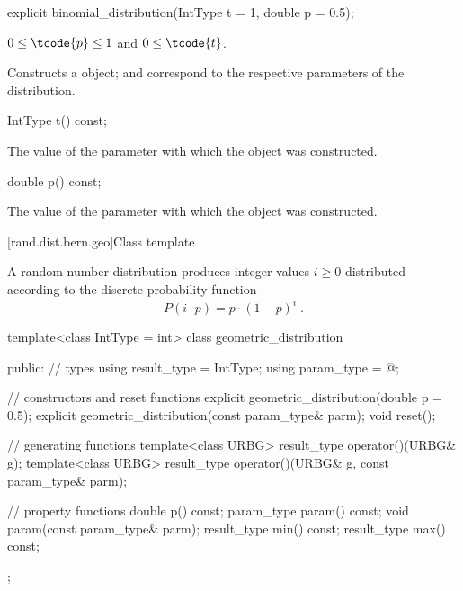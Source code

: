%
\begin{itemdecl}
explicit binomial_distribution(IntType t = 1, double p = 0.5);
\end{itemdecl}

\begin{itemdescr}
\pnum\requires
 $0 \leq \tcode{p} \leq 1$ and $0 \leq \tcode{t} $.

\pnum\effects Constructs a  object;
  and 
 correspond to the respective parameters of the distribution.
\end{itemdescr}

%
\begin{itemdecl}
IntType t() const;
\end{itemdecl}%
\begin{itemdescr}
\pnum\returns The value of the  parameter
 with which the object was constructed.
\end{itemdescr}

%
\begin{itemdecl}
double p() const;
\end{itemdecl}

\begin{itemdescr}
\pnum\returns The value of the  parameter
 with which the object was constructed.
\end{itemdescr}


[rand.dist.bern.geo]{Class template }
%
%

\pnum
A  random number distribution
produces integer values $i \geq 0$
distributed according to
the discrete probability function
%
%
\[%
 P(i\,|\,p)
      = p \cdot (1-p)^{i}
\; \mbox{.}
\]

%
\begin{codeblock}
template<class IntType = int>
 class geometric_distribution
{
public:
 // types
 using result_type = IntType;
 using param_type  = @\unspec@;

 // constructors and reset functions
 explicit geometric_distribution(double p = 0.5);
 explicit geometric_distribution(const param_type& parm);
 void reset();

 // generating functions
 template<class URBG>
   result_type operator()(URBG& g);
 template<class URBG>
   result_type operator()(URBG& g, const param_type& parm);

 // property functions
 double p() const;
 param_type param() const;
 void param(const param_type& parm);
 result_type min() const;
 result_type max() const;
 };
\end{codeblock}


